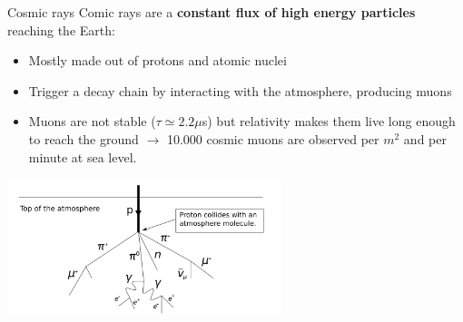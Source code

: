 \documentclass[8 pt]{beamer}
\begin{document}
\begin{frame}{Cosmic rays}
\justifying
Comic rays are a \textbf{constant flux of high energy particles} reaching the Earth:
\begin{itemize}
	\justifying
	\item Mostly made out of protons and atomic nuclei
	\item Trigger a decay chain by interacting with the atmosphere, producing muons
	\item Muons are not stable ($\tau \simeq 2.2\mu$s) but relativity makes them live long enough to reach the ground $\rightarrow$ 10.000 cosmic muons are observed per $m^2$ and per minute at sea level.
\end{itemize} \vfill

\begin{minipage}[c]{.98\textwidth}
	\begin{center}
	\includegraphics[width=8cm, height=4cm]{figs/cosmic.png}
	\end{center}
\end{minipage} \hfill \vfill
\end{frame}
\end{document}
